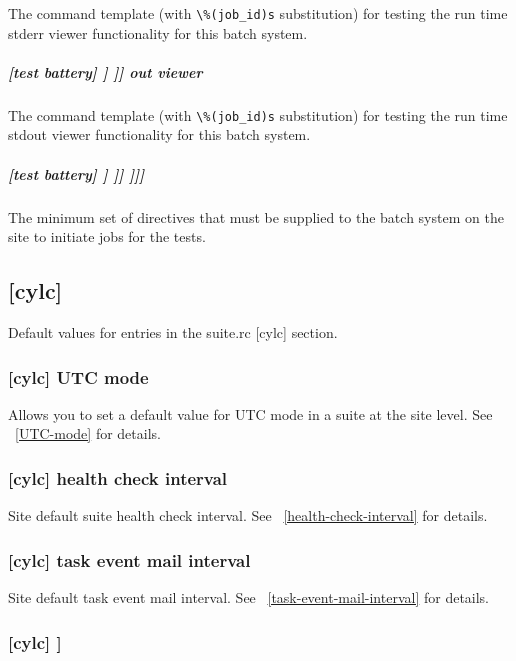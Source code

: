 The command template (with \lstinline=\%(job_id)s= substitution) for testing
the run time stderr viewer functionality for this batch system.

\subparagraph[out viewer]{[test battery] \textrightarrow [[batch systems]] \textrightarrow [[[SYSTEM]]] \textrightarrow out viewer}

The command template (with \lstinline=\%(job_id)s= substitution) for testing
the run time stdout viewer functionality for this batch system.

\subparagraph[{[[[[}directives{]]]]}]{[test battery] \textrightarrow [[batch systems]] \textrightarrow [[[SYSTEM]]] \textrightarrow [[[[directives]]]]}

The minimum set of directives that must be supplied to the batch system on the
site to initiate jobs for the tests.

\subsection{[cylc]}

Default values for entries in the suite.rc [cylc] section.

\subsubsection[UTC mode]{[cylc] \textrightarrow UTC mode}
\label{SiteUTCMode}

Allows you to set a default value for UTC mode in a suite at the site level.
See ~\ref{UTC-mode} for details.

\subsubsection[health check interval]{[cylc] \textrightarrow health check interval}

Site default suite health check interval.
See ~\ref{health-check-interval} for details.

\subsubsection[task event mail interval]{[cylc] \textrightarrow task event mail interval}

Site default task event mail interval.
See ~\ref{task-event-mail-interval} for details.

\subsubsection[{[}events{]}]{[cylc] \textrightarrow [[events]]}
\label{SiteCylcHooks}


